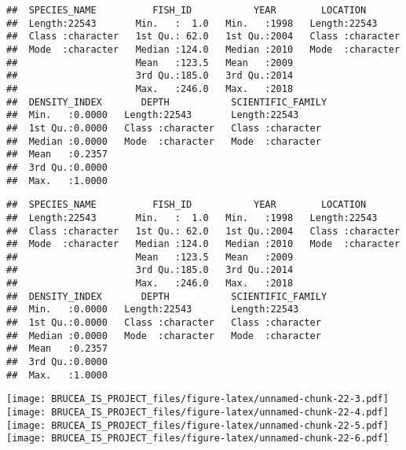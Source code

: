 \documentclass[
]{article}
\begin{document}
\begin{verbatim}
##  SPECIES_NAME          FISH_ID           YEAR        LOCATION        
##  Length:22543       Min.   :  1.0   Min.   :1998   Length:22543      
##  Class :character   1st Qu.: 62.0   1st Qu.:2004   Class :character  
##  Mode  :character   Median :124.0   Median :2010   Mode  :character  
##                     Mean   :123.5   Mean   :2009                     
##                     3rd Qu.:185.0   3rd Qu.:2014                     
##                     Max.   :246.0   Max.   :2018                     
##  DENSITY_INDEX       DEPTH           SCIENTIFIC_FAMILY 
##  Min.   :0.0000   Length:22543       Length:22543      
##  1st Qu.:0.0000   Class :character   Class :character  
##  Median :0.0000   Mode  :character   Mode  :character  
##  Mean   :0.2357                                        
##  3rd Qu.:0.0000                                        
##  Max.   :1.0000
\end{verbatim}

\begin{verbatim}
##  SPECIES_NAME          FISH_ID           YEAR        LOCATION        
##  Length:22543       Min.   :  1.0   Min.   :1998   Length:22543      
##  Class :character   1st Qu.: 62.0   1st Qu.:2004   Class :character  
##  Mode  :character   Median :124.0   Median :2010   Mode  :character  
##                     Mean   :123.5   Mean   :2009                     
##                     3rd Qu.:185.0   3rd Qu.:2014                     
##                     Max.   :246.0   Max.   :2018                     
##  DENSITY_INDEX       DEPTH           SCIENTIFIC_FAMILY 
##  Min.   :0.0000   Length:22543       Length:22543      
##  1st Qu.:0.0000   Class :character   Class :character  
##  Median :0.0000   Mode  :character   Mode  :character  
##  Mean   :0.2357                                        
##  3rd Qu.:0.0000                                        
##  Max.   :1.0000
\end{verbatim}

\texttt{[image: BRUCEA\_IS\_PROJECT\_files/figure-latex/unnamed-chunk-22-3.pdf]}
\texttt{[image: BRUCEA\_IS\_PROJECT\_files/figure-latex/unnamed-chunk-22-4.pdf]}
\texttt{[image: BRUCEA\_IS\_PROJECT\_files/figure-latex/unnamed-chunk-22-5.pdf]}
\texttt{[image: BRUCEA\_IS\_PROJECT\_files/figure-latex/unnamed-chunk-22-6.pdf]}
\end{document}
